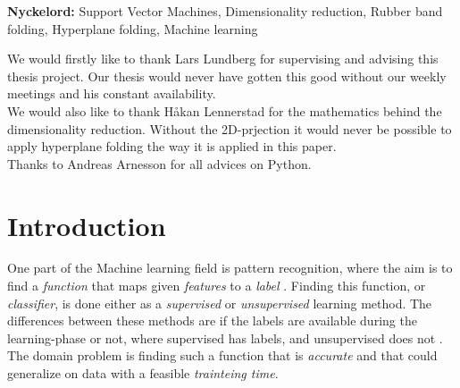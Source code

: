 \documentclass[a4paper,twoside]{bth}
\begin{document}
\vspace{1cm}
\noindent
\textbf{Nyckelord:} Support Vector Machines, Dimensionality reduction, Rubber band folding, Hyperplane folding, Machine learning

\cleardoublepage


\acknowledgments %
\noindent
We would firstly like to thank Lars Lundberg for supervising and advising this thesis project. Our thesis would never have gotten this good without our weekly meetings and his constant availability.\\
We would also like to thank Håkan Lennerstad for the mathematics behind the dimensionality reduction. Without the 2D-prjection it would never be possible to apply hyperplane folding the way it is applied in this paper.\\
Thanks to Andreas Arnesson for all advices on Python.

\cleardoublepage


\tableofcontents

\cleardoublepage
\pagestyle{headings}



\chapter{Introduction}
\label{sec:introduction}  %
One part of the Machine learning field is pattern recognition, where the aim is to find a \textit{function} that maps given \textit{features} to a \textit{label} \cite{Japkowicz:2011}. Finding this function, or \textit{classifier}, is done either as a \textit{supervised} or \textit{unsupervised} learning method. The differences between these methods are if the labels are available during the learning-phase or not, where supervised has labels, and unsupervised does not \cite{Japkowicz:2011}. The domain problem is finding such a function that is \textit{accurate} and that could generalize on data \cite{} with a feasible \textit{trainteing time}.
\end{document}
